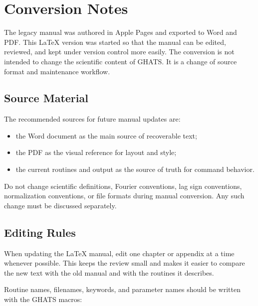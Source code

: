 \chapter{Conversion Notes}

The legacy manual was authored in Apple Pages and exported to Word and PDF.
This LaTeX version was started so that the manual can be edited, reviewed, and
kept under version control more easily.  The conversion is not intended to
change the scientific content of GHATS.  It is a change of source format and
maintenance workflow.

\section{Source Material}

The recommended sources for future manual updates are:

\begin{itemize}
\item the Word document as the main source of recoverable text;
\item the PDF as the visual reference for layout and style;
\item the current routines and  output as the source of truth
  for command behavior.
\end{itemize}

\begin{ghatsnote}
Do not change scientific definitions, Fourier conventions, lag sign
conventions, normalization conventions, or file formats during manual
conversion. Any such change must be discussed separately.
\end{ghatsnote}

\section{Editing Rules}

When updating the LaTeX manual, edit one chapter or appendix at a time whenever
possible.  This keeps the review small and makes it easier to compare the new
text with the old manual and with the routines it describes.

Routine names, filenames, keywords, and parameter names should be written with
the GHATS macros:

\begin{ghatsconsole}
\end{ghatsconsole}

